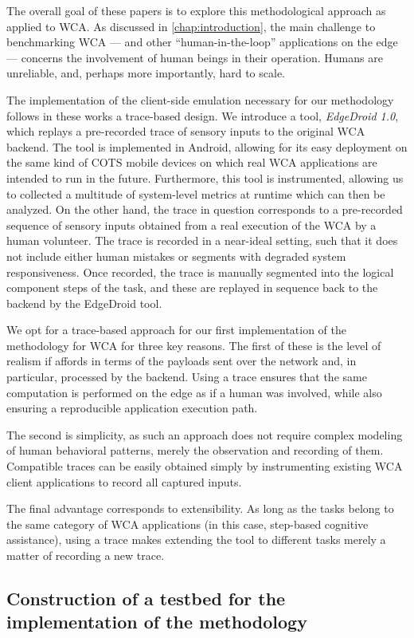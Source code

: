 The overall goal of these papers is to explore this methodological approach as applied to \gls{WCA}.
As discussed in \cref{chap:introduction}, the main challenge to benchmarking \gls{WCA} --- and other ``human-in-the-loop'' applications on the edge --- concerns the involvement of human beings in their operation.
Humans are unreliable, and, perhaps more importantly, hard to scale.

The implementation of the client-side emulation necessary for our methodology follows in these works a trace-based design.
We introduce a tool, \emph{EdgeDroid \num{1.0}}, which replays a pre-recorded trace of sensory inputs to the original \gls{WCA} backend.
The tool is implemented in Android, allowing for its easy deployment on the same kind of \gls{COTS} mobile devices on which real \gls{WCA} applications are intended to run in the future.
Furthermore, this tool is instrumented, allowing us to collected a multitude of system-level metrics at runtime which can then be analyzed.
On the other hand, the trace in question corresponds to a pre-recorded sequence of sensory inputs obtained from a real execution of the \gls{WCA} by a human volunteer.
The trace is recorded in a near-ideal setting, such that it does not include either human mistakes or segments with degraded system responsiveness.
Once recorded, the trace is manually segmented into the logical component steps of the task, and these are replayed in sequence back to the backend by the EdgeDroid tool.

We opt for a trace-based approach for our first implementation of the methodology for \gls{WCA} for three key reasons.
The first of these is the level of realism if affords in terms of the payloads sent over the network and, in particular, processed by the backend.
Using a trace ensures that the same computation is performed on the edge as if a human was involved, while also ensuring a reproducible application execution path.

The second is simplicity, as such an approach does not require complex modeling of human behavioral patterns, merely the observation and recording of them.
Compatible traces can be easily obtained simply by instrumenting existing \gls{WCA} client applications to record all captured inputs.

The final advantage corresponds to extensibility.
As long as the tasks belong to the same category of \gls{WCA} applications (in this case, step-based cognitive assistance), using a trace makes extending the tool to different tasks merely a matter of recording a new trace.

\todo[inline]{}


\todo[inline]{}

\subsection{Construction of a testbed for the implementation of the methodology}\label{sec:testbed}

\todo[inline]{}
